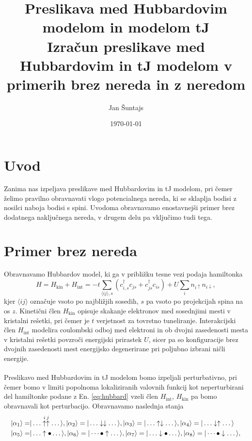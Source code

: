 \documentclass[10pt,a4paper]{article}
\author{\normalsize Jan Šuntajs } %
\title{\large Preslikava med Hubbardovim modelom in modelom tJ \\ 
\vspace{3mm}
\Large Izračun preslikave med Hubbardovim in tJ modelom v primerih brez nereda in z neredom}
\date{\normalsize \today}
\begin{document}
\maketitle
\section{Uvod}
Zanima nas izpeljava preslikave med Hubbardovim in tJ modelom, pri čemer želimo pravilno obravnavati vlogo potencialnega nereda, ki se sklaplja bodisi z nosilci naboja bodisi s spini. Uvodoma obravnavamo enostavnejši primer brez dodatnega naključnega nereda, v drugem delu pa vključimo tudi tega. 
\section{Primer brez nereda}
Obravnavamo Hubbardov model, ki ga v približku tesne vezi podaja hamiltonka
\begin{equation}\label{eq:hubbard}
H=H_\mathrm{kin} + H_\mathrm{int}=-t\sum\limits_{\langle ij \rangle, s}\left(c^\dagger_{i,s} c_{js} + c^\dagger_{js}c_{is}\right) + U\sum_i n_{i\uparrow}n_{i\downarrow},
\end{equation}
kjer $\langle ij \rangle$ označuje vsoto po najbližjih sosedih, $s$ pa vsoto po projekcijah spina na os $z$. 
Kinetični člen $H_\mathrm{kin}$ opisuje skakanje elektronov med sosednjimi mesti v kristalni rešetki, pri čemer je $t$ verjetnost za tovrstno tuneliranje. Interakcijski člen $H_\mathrm{int}$ modelira coulombski odboj med elektroni in ob dvojni zasedenosti mesta v kristalni rešetki povzroči energijski prirastek $U$, sicer pa so konfiguracije brez dvojnih zasedenosti mest energijsko degenerirane pri poljubno izbrani ničli energije. \\\\
Preslikavo med Hubbardovim in tJ modelom bomo izpeljali perturbativno, pri čemer bomo v limiti popolnoma lokaliziranih valovnih funkcij kot neperturbirani del hamiltonke podane z En. \eqref{eq:hubbard} vzeli člen $H_\mathrm{int}$, $H_\mathrm{kin}$ pa bomo obravnavali kot perturbacijo. Obravnavamo naslednja stanja
\begin{equation}\label{eq:stanja}
\begin{split}
\vert\alpha_1\rangle=& \vert \dots \overset{i}{\uparrow} \overset{j}{\uparrow} \dots \rangle, \vert\alpha_2\rangle=\vert\dots \downarrow \downarrow\dots \rangle, \vert\alpha_3\rangle=\vert\dots \uparrow \downarrow\dots \rangle, \vert\alpha_4\rangle=\vert\dots \downarrow \uparrow\dots \rangle \\
\vert\alpha_5\rangle=& \vert\dots \uparrow \bullet\dots\rangle, \vert\alpha_6\rangle=\vert\dots  \bullet  \uparrow \dots\rangle, \vert\alpha_7\rangle=\vert\dots \downarrow \bullet\dots\rangle, \vert\alpha_8\rangle=\vert\dots  \bullet  \downarrow \dots\rangle, 
\end{split}
\end{equation}
\end{document}
